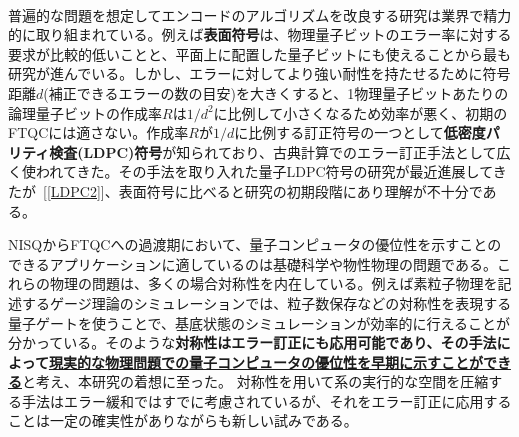 \documentclass[11pt,a4j,dvipdfmx]{jarticle} 					%
\newcommand{\研究課題名}{誤り耐性量子コンピュータに向けた誤り訂正技術の開発(仮)}
\newcommand{\研究機関名}{東京大学}
\newcommand{\研究代表者氏名}{寺師弘二}
\newcommand{\研究期間の最終元号年度}{10}  %
\newcommand{\mybf}[1]{{\bfseries\sffamily#1}}
\begin{document}
\\
%
普遍的な問題を想定してエンコードのアルゴリズムを改良する研究は業界で精力的に取り組まれている。例えば\mybf{表面符号}は、物理量子ビットのエラー率に対する要求が比較的低いことと、平面上に配置した量子ビットにも使えることから最も研究が進んでいる。しかし、エラーに対してより強い耐性を持たせるために符号距離$d$(補正できるエラーの数の目安)を大きくすると、1物理量子ビットあたりの論理量子ビットの作成率$R$は$1/d^2$に比例して小さくなるため効率が悪く、初期のFTQCには適さない。作成率$R$が$1/d$に比例する訂正符号の一つとして\mybf{低密度パリティ検査(LDPC)符号}が知られており、古典計算でのエラー訂正手法として広く使われてきた。その手法を取り入れた量子LDPC符号の研究が最近進展してきたが~[\ref{LDPC2}]、表面符号に比べると研究の初期段階にあり理解が不十分である。

NISQからFTQCへの過渡期において、量子コンピュータの優位性を示すことのできるアプリケーションに適しているのは基礎科学や物性物理の問題である。これらの物理の問題は、多くの場合対称性を内在している。例えば素粒子物理を記述するゲージ理論のシミュレーションでは、粒子数保存などの対称性を表現する量子ゲートを使うことで、基底状態のシミュレーションが効率的に行えることが分かっている。そのような\mybf{対称性はエラー訂正にも応用可能であり、その手法によって\ul{現実的な物理問題での量子コンピュータの優位性を早期に示すことができる}}と考え、本研究の着想に至った。
対称性を用いて系の実行的な空間を圧縮する手法はエラー緩和ではすでに考慮されているが、それをエラー訂正に応用することは一定の確実性がありながらも新しい試みである。
\end{document}
